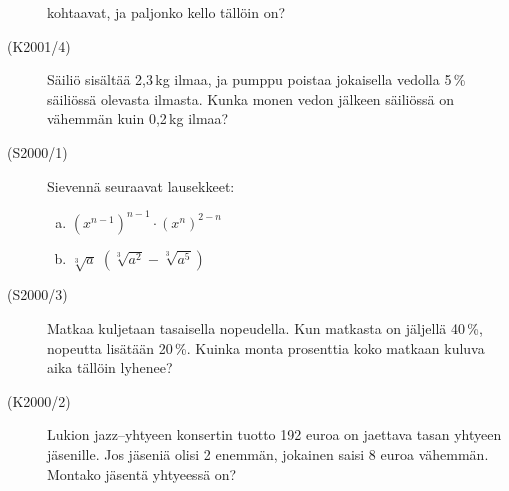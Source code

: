 \begin{description}
                        kohtaavat, ja paljonko kello tällöin on? 
    \item[(K2001/4)]   Säiliö sisältää 2,3\,kg ilmaa, ja pumppu poistaa jokaisella
                        vedolla 5\,\% säiliössä olevasta ilmasta. Kunka monen vedon
                        jälkeen säiliössä on vähemmän kuin 0,2\,kg ilmaa?
    \item[(S2000/1)]   Sievennä seuraavat lausekkeet:
                        \begin{enumerate}[(a)]
                            \item $ \left( x^{n - 1} \right)^{n - 1} \cdot
                                \left( x^{n} \right)^{2 - n} $
                            \item $ \sqrt[3]{a} \; ( \sqrt[3]{a^2} - \sqrt[3]{a^5}) $
                        \end{enumerate}
    \item[(S2000/3)]   Matkaa kuljetaan tasaisella nopeudella. Kun matkasta on
                        jäljellä 40\,\%, nopeutta lisätään 20\,\%. Kuinka monta
                        prosenttia koko matkaan kuluva aika tällöin lyhenee?
    \item[(K2000/2)]   Lukion jazz--yhtyeen konsertin tuotto 192 euroa on jaettava
                        tasan yhtyeen jäsenille. Jos jäseniä olisi 2 enemmän, jokainen
                        saisi 8 euroa vähemmän. Montako jäsentä yhtyeessä on?

\end{description}
